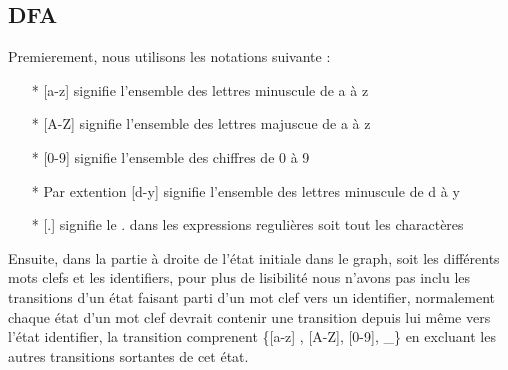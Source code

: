 \documentclass[a4paper,10pt]{article}
\begin{document}
\subsection{DFA}

Premierement, nous utilisons les notations suivante :
\begin{itemize}
\item [*][a-z] signifie l'ensemble des lettres minuscule de a à z
\item [*][A-Z] signifie l'ensemble des lettres majuscue de a à z
\item [*][0-9] signifie l'ensemble des chiffres de 0 à 9
\item [*]Par extention [d-y] signifie l'ensemble des lettres minuscule de d à y
\item [*][.] signifie le . dans les expressions regulières soit tout les charactères
\end{itemize}

Ensuite, dans la partie à droite de l'état initiale dans le graph, soit les différents mots clefs et les identifiers, pour plus de lisibilité nous n'avons pas inclu les transitions d'un état faisant parti d'un mot clef vers un identifier, normalement chaque état d'un mot clef devrait contenir une transition depuis lui même vers l'état identifier, la transition comprenent \{[a-z] , [A-Z], [0-9], \_\} en excluant les autres transitions sortantes de cet état.
\end{document}
